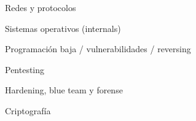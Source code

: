 
Redes y protocolos

Sistemas operativos (internals)

Programación baja / vulnerabilidades / reversing

Pentesting

Hardening, blue team y forense

Criptografía
